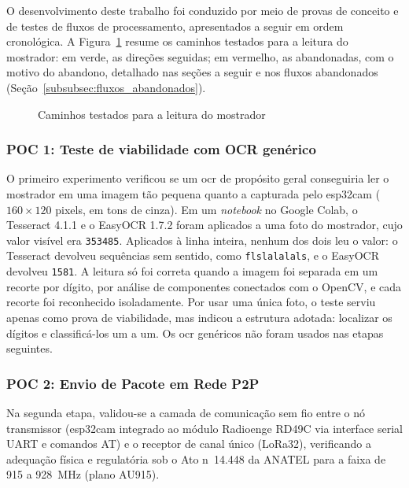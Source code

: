 O desenvolvimento deste trabalho foi conduzido por meio de provas de conceito e de testes
de fluxos de processamento, apresentados a seguir em ordem cronológica.
A Figura~\ref{fig:arvore_pocs} resume os caminhos testados para a leitura do mostrador:
em verde, as direções seguidas; em vermelho, as abandonadas, com o motivo do abandono,
detalhado nas seções a seguir e nos fluxos abandonados
(Seção~\ref{subsubsec:fluxos_abandonados}).

\begin{figure}[H]
    \centering
    \caption{Caminhos testados para a leitura do mostrador}
    \label{fig:arvore_pocs}
    \resizebox{\textwidth}{!}{}
\end{figure}

\subsubsection{POC 1: Teste de viabilidade com OCR genérico}
\label{metodologia_pesquisa:poc1}

O primeiro experimento verificou se um \gls{ocr} de propósito geral conseguiria ler o
mostrador em uma imagem tão pequena quanto a capturada pelo \gls{esp32cam}
($160 \times 120$ pixels, em tons de cinza). Em um \textit{notebook} no Google Colab, o
Tesseract 4.1.1 e o EasyOCR 1.7.2 foram aplicados a uma foto do mostrador, cujo valor
visível era \texttt{353485}. Aplicados à linha inteira, nenhum dos dois leu o valor: o
Tesseract devolveu sequências sem sentido, como \texttt{flslalalals}, e o EasyOCR devolveu
\texttt{1581}. A leitura só foi correta quando a imagem foi separada em um recorte por
dígito, por análise de componentes conectados com o OpenCV, e cada recorte foi
reconhecido isoladamente. Por usar uma única foto, o teste serviu apenas como prova de
viabilidade, mas indicou a estrutura adotada: localizar os dígitos e classificá-los um a
um. Os \gls{ocr} genéricos não foram usados nas etapas seguintes.

\subsubsection{POC 2: Envio de Pacote em Rede P2P}
\label{metodologia_pesquisa:poc2}

Na segunda etapa, validou-se a camada de comunicação sem fio entre o nó transmissor
(\gls{esp32cam} integrado ao módulo Radioenge RD49C via interface serial UART e comandos
AT) e o receptor de canal único (LoRa32), verificando a adequação física e regulatória
sob o Ato n\textordmasculine~14.448 da ANATEL \cite{anatel2017} para a faixa de 915 a
928~MHz (plano AU915).

